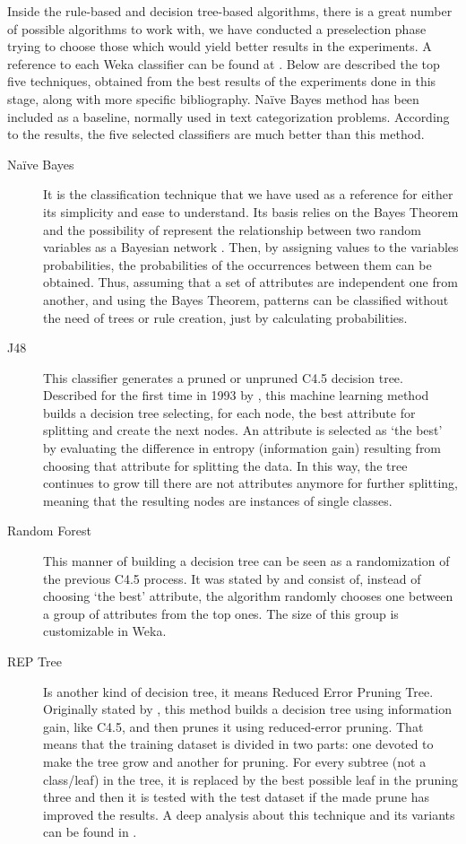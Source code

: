 Inside the rule-based and decision tree-based algorithms, there is a great number of possible algorithms to work with, we have conducted a preselection phase trying to choose those which would yield better results in the experiments. A reference to each Weka classifier can be found at \cite{witten2016data}. Below are described the top five techniques, obtained from the best results  of the experiments done in this stage, along with more specific bibliography. Na\"{i}ve Bayes method \cite{Bayesian_Classifier_97} has been included as a baseline, normally used in text categorization problems. According to the results, the five selected classifiers are much better than this method.

\begin{description}
  \item[Na\"{i}ve Bayes] It is the classification technique that we have used as a reference for either its simplicity and ease to understand. Its basis relies on the Bayes Theorem and the possibility of represent the relationship between two random variables as a Bayesian network \cite{rish2001empirical}. Then, by assigning values to the variables probabilities, the probabilities of the occurrences between them can be obtained. Thus, assuming that a set of attributes are independent one from another, and using the Bayes Theorem, patterns can be classified without the need of trees or rule creation, just by calculating probabilities.
   \item[J48] This classifier generates a pruned or unpruned C4.5 decision tree. Described for the first time in 1993 by \cite{Quinlan1993}, this machine learning method builds a decision tree selecting, for each node, the best attribute for splitting and create the next nodes. An attribute is selected as `the best' by evaluating the difference in entropy (information gain) resulting from choosing that attribute for splitting the data. In this way, the tree continues to grow till there are not attributes anymore for further splitting, meaning that the resulting nodes are instances of single classes. 
   \item[Random Forest] This manner of building a decision tree can be seen as a randomization of the previous C4.5 process. It was stated by \cite{Breiman2001} and consist of, instead of choosing `the best' attribute, the algorithm randomly chooses one between a group of attributes from the top ones. The size of this group is customizable in Weka.
   \item[REP Tree] Is another kind of decision tree, it means Reduced Error Pruning Tree. Originally stated by \cite{Quinlan1987}, this method builds a decision tree using information gain, like C4.5, and then prunes it using reduced-error pruning. That means that the training dataset is divided in two parts: one devoted to make the tree grow and another for pruning. For every subtree (not a class/leaf) in the tree, it is replaced by the best possible leaf in the pruning three and then it is tested with the test dataset if the made prune has improved the results. A deep analysis about this technique and its variants can be found in \cite{Elomaa2001}.

\end{description}
